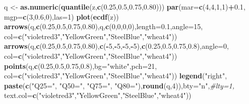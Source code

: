 \documentclass[polish,]{book}
\newenvironment{Shaded}{\begin{snugshade}}{\end{snugshade}}
\newcommand{\CommentTok}[1]{\textcolor[rgb]{0.56,0.35,0.01}{\textit{#1}}}
\newcommand{\DataTypeTok}[1]{\textcolor[rgb]{0.13,0.29,0.53}{#1}}
\newcommand{\DecValTok}[1]{\textcolor[rgb]{0.00,0.00,0.81}{#1}}
\newcommand{\FloatTok}[1]{\textcolor[rgb]{0.00,0.00,0.81}{#1}}
\newcommand{\KeywordTok}[1]{\textcolor[rgb]{0.13,0.29,0.53}{\textbf{#1}}}
\newcommand{\NormalTok}[1]{#1}
\newcommand{\OperatorTok}[1]{\textcolor[rgb]{0.81,0.36,0.00}{\textbf{#1}}}
\newcommand{\StringTok}[1]{\textcolor[rgb]{0.31,0.60,0.02}{#1}}
\begin{document}
\begin{Shaded}
\begin{Highlighting}[]
\NormalTok{q <-}\StringTok{ }\KeywordTok{as.numeric}\NormalTok{(}\KeywordTok{quantile}\NormalTok{(z,}\KeywordTok{c}\NormalTok{(}\FloatTok{0.25}\NormalTok{,}\FloatTok{0.5}\NormalTok{,}\FloatTok{0.75}\NormalTok{,}\FloatTok{0.80}\NormalTok{)))}
\KeywordTok{par}\NormalTok{(}\DataTypeTok{mar=}\KeywordTok{c}\NormalTok{(}\DecValTok{4}\NormalTok{,}\DecValTok{4}\NormalTok{,}\DecValTok{1}\NormalTok{,}\DecValTok{1}\NormalTok{)}\OperatorTok{+}\FloatTok{0.1}\NormalTok{, }\DataTypeTok{mgp=}\KeywordTok{c}\NormalTok{(}\DecValTok{3}\NormalTok{,}\FloatTok{0.6}\NormalTok{,}\DecValTok{0}\NormalTok{),}\DataTypeTok{las=}\DecValTok{1}\NormalTok{)}
\KeywordTok{plot}\NormalTok{(}\KeywordTok{ecdf}\NormalTok{(z))}
\KeywordTok{arrows}\NormalTok{(q,}\KeywordTok{c}\NormalTok{(}\FloatTok{0.25}\NormalTok{,}\FloatTok{0.5}\NormalTok{,}\FloatTok{0.75}\NormalTok{,}\FloatTok{0.80}\NormalTok{),q,}\KeywordTok{c}\NormalTok{(}\DecValTok{0}\NormalTok{,}\DecValTok{0}\NormalTok{,}\DecValTok{0}\NormalTok{,}\DecValTok{0}\NormalTok{),}\DataTypeTok{length=}\FloatTok{0.1}\NormalTok{,}\DataTypeTok{angle=}\DecValTok{15}\NormalTok{,}
       \DataTypeTok{col=}\KeywordTok{c}\NormalTok{(}\StringTok{"violetred3"}\NormalTok{,}\StringTok{"YellowGreen"}\NormalTok{,}\StringTok{"SteelBlue"}\NormalTok{,}\StringTok{"wheat4"}\NormalTok{))}
\KeywordTok{arrows}\NormalTok{(q,}\KeywordTok{c}\NormalTok{(}\FloatTok{0.25}\NormalTok{,}\FloatTok{0.5}\NormalTok{,}\FloatTok{0.75}\NormalTok{,}\FloatTok{0.80}\NormalTok{),}\KeywordTok{c}\NormalTok{(}\OperatorTok{-}\DecValTok{5}\NormalTok{,}\OperatorTok{-}\DecValTok{5}\NormalTok{,}\OperatorTok{-}\DecValTok{5}\NormalTok{,}\OperatorTok{-}\DecValTok{5}\NormalTok{),}\KeywordTok{c}\NormalTok{(}\FloatTok{0.25}\NormalTok{,}\FloatTok{0.5}\NormalTok{,}\FloatTok{0.75}\NormalTok{,}\FloatTok{0.8}\NormalTok{),}\DataTypeTok{angle=}\DecValTok{0}\NormalTok{,}
       \DataTypeTok{col=}\KeywordTok{c}\NormalTok{(}\StringTok{"violetred3"}\NormalTok{,}\StringTok{"YellowGreen"}\NormalTok{,}\StringTok{"SteelBlue"}\NormalTok{,}\StringTok{"wheat4"}\NormalTok{))}
\KeywordTok{points}\NormalTok{(q,}\KeywordTok{c}\NormalTok{(}\FloatTok{0.25}\NormalTok{,}\FloatTok{0.5}\NormalTok{,}\FloatTok{0.75}\NormalTok{,}\FloatTok{0.8}\NormalTok{),}\DataTypeTok{bg=}\StringTok{"white"}\NormalTok{,}\DataTypeTok{pch=}\DecValTok{21}\NormalTok{,}
       \DataTypeTok{col=}\KeywordTok{c}\NormalTok{(}\StringTok{"violetred3"}\NormalTok{,}\StringTok{"YellowGreen"}\NormalTok{,}\StringTok{"SteelBlue"}\NormalTok{,}\StringTok{"wheat4"}\NormalTok{))}
\KeywordTok{legend}\NormalTok{(}\StringTok{"right"}\NormalTok{, }\KeywordTok{paste}\NormalTok{(}\KeywordTok{c}\NormalTok{(}\StringTok{"Q25="}\NormalTok{, }\StringTok{"Q50="}\NormalTok{, }\StringTok{"Q75="}\NormalTok{, }\StringTok{"Q80="}\NormalTok{),}\KeywordTok{round}\NormalTok{(q,}\DecValTok{4}\NormalTok{)),}\DataTypeTok{bty=}\StringTok{"n"}\NormalTok{,}\CommentTok{#lty=1,}
       \DataTypeTok{text.col=}\KeywordTok{c}\NormalTok{(}\StringTok{"violetred3"}\NormalTok{,}\StringTok{"YellowGreen"}\NormalTok{,}\StringTok{"SteelBlue"}\NormalTok{,}\StringTok{"wheat4"}\NormalTok{))}
\end{Highlighting}
\end{Shaded}
\end{document}
